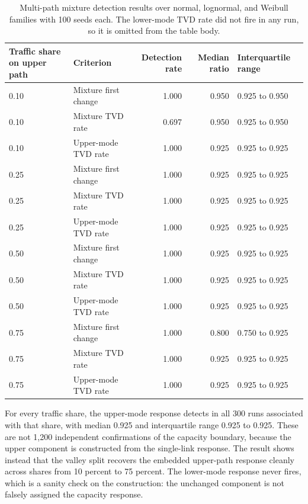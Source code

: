 \documentclass[a4paper,11pt]{report}
\begin{document}
\begin{table}[htbp]
\centering
\small
\begin{tabular}{p{}p{}rrp{}}
\toprule
Traffic share on upper path & Criterion & Detection rate & Median ratio & Interquartile range \\
\midrule
0.10 & Mixture first change & 1.000 & 0.950 & 0.925 to 0.950 \\
0.10 & Mixture TVD rate & 0.697 & 0.950 & 0.925 to 0.950 \\
0.10 & Upper-mode TVD rate & 1.000 & 0.925 & 0.925 to 0.925 \\
0.25 & Mixture first change & 1.000 & 0.925 & 0.925 to 0.925 \\
0.25 & Mixture TVD rate & 1.000 & 0.925 & 0.925 to 0.925 \\
0.25 & Upper-mode TVD rate & 1.000 & 0.925 & 0.925 to 0.925 \\
0.50 & Mixture first change & 1.000 & 0.925 & 0.925 to 0.925 \\
0.50 & Mixture TVD rate & 1.000 & 0.925 & 0.925 to 0.925 \\
0.50 & Upper-mode TVD rate & 1.000 & 0.925 & 0.925 to 0.925 \\
0.75 & Mixture first change & 1.000 & 0.800 & 0.750 to 0.925 \\
0.75 & Mixture TVD rate & 1.000 & 0.925 & 0.925 to 0.925 \\
0.75 & Upper-mode TVD rate & 1.000 & 0.925 & 0.925 to 0.925 \\
\bottomrule
\end{tabular}
\caption{Multi-path mixture detection results over normal, lognormal, and Weibull families with 100 seeds each. The lower-mode TVD rate did not fire in any run, so it is omitted from the table body.}
\label{tab:multipath-methods}
\end{table}

For every traffic share, the upper-mode response detects in all 300 runs associated with that share, with median 0.925 and interquartile range 0.925 to 0.925. These are not 1,200 independent confirmations of the capacity boundary, because the upper component is constructed from the single-link response. The result shows instead that the valley split recovers the embedded upper-path response cleanly across shares from 10 percent to 75 percent. The lower-mode response never fires, which is a sanity check on the construction: the unchanged component is not falsely assigned the capacity response.
\end{document}
